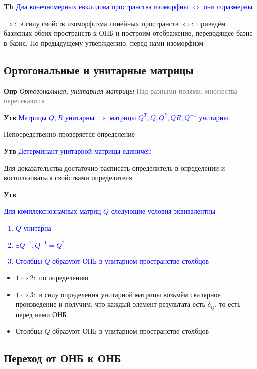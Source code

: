 \documentclass[a4paper, 14pt]{article}
\begin{document}
    \textbf{Th} \textcolor{blue}{Два конечномерных евклидова пространства изоморфны $\Leftrightarrow$ они соразмерны}
    
    $\Rightarrow:$ в силу свойств изоморфизма линейных пространств
    $\Leftrightarrow:$ приведём базисных обеих пространств к ОНБ и построим отображение, переводящее базис в базис.
    По предыдущему утверждению, перед нами изоморфизм
    
    \subsection{Ортогональные и унитарные матрицы}
    
    \textbf{Опр} \textit{Ортогональная, унитарная матрицы} \textcolor{gray}{Над разными полями, множества пересекаются}
    
    \textbf{Утв} \textcolor{blue}{Матрицы $Q, R$ унитарны $\Rightarrow$ матрицы $Q^T, \overline{Q}, Q^*, QR, Q^{-1}$
        унитарны}
    
    Непосредственно проверяется определение
    
    \textbf{Утв} \textcolor{blue}{Детерминант унитарной матрицы единичен}
    
    Для доказательства достаточно расписать определитель в определении и воспользоваться свойствами определителя
    
    \textbf{Утв} \textcolor{blue}{Для комплекснозначных матриц $Q$ следующие условия эквивалентны
        \begin{enumerate}
            \item $Q$ унитарна
            \item $\exists Q^{-1},  Q^{-1} = Q^*$
            \item Столбцы $Q$ образуют ОНБ в унитарном пространстве столбцов
        \end{enumerate}               }
    
    \begin{itemize}
        \item $1 \Leftrightarrow 2:$ по определению
        \item $1 \Leftrightarrow 3:$ в силу определения унитарной матрицы возьмём скалярное произведение и получим,
        что каждый элемент результата есть $\delta_{ij}$, то есть перед нами ОНБ
        \item Столбцы $Q$ образуют ОНБ в унитарном пространстве столбцов
    \end{itemize}
    
    \subsection{Переход от ОНБ к ОНБ}
    
\end{document}

